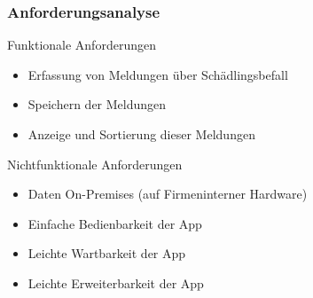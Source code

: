 \begin{frame}
  \frametitle{Anforderungsanalyse}

  \begin{block}{ Funktionale Anforderungen}
 	\begin{itemize}
	\item Erfassung von Meldungen über Schädlingsbefall
	 \item Speichern der Meldungen
	\item Anzeige und Sortierung dieser Meldungen
	\end{itemize}
  \end{block}

  \begin{alertblock}{Nichtfunktionale Anforderungen}
 	\begin{itemize}
	\item Daten On-Premises (auf Firmeninterner Hardware)
	 \item Einfache Bedienbarkeit der App
	\item Leichte Wartbarkeit der App
	\item Leichte Erweiterbarkeit der App
	\end{itemize}
  \end{alertblock}

\end{frame}